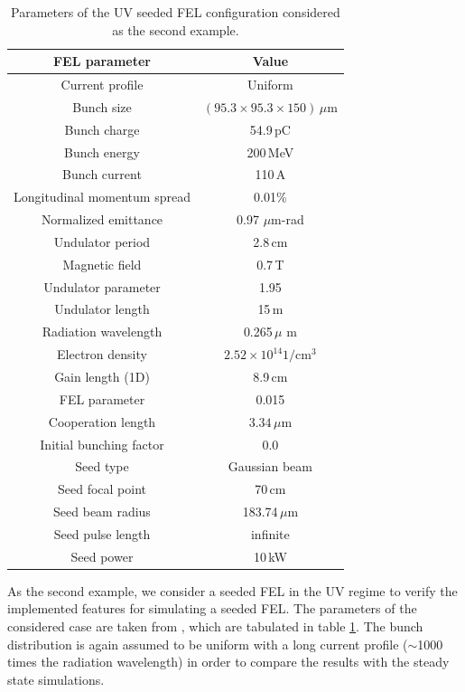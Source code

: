 \begin{table}
\label{example2}
\caption{Parameters of the UV seeded FEL configuration considered as the second example.}
\centering
\begin{tabular}{|c||c|}
\hline
FEL parameter & Value \\ \hline \hline
Current profile & Uniform \\ \hline
Bunch size & $(95.3\times95.3\times150)\,\mu$m \\ \hline
Bunch charge & 54.9\,pC \\ \hline
Bunch energy & 200\,MeV \\	\hline
Bunch current & 110\,A \\ \hline
Longitudinal momentum spread & 0.01\% \\ \hline
Normalized emittance & 0.97 $\mu$m-rad \\	\hline
Undulator period & 2.8\,cm \\ \hline
Magnetic field & 0.7\,T \\ \hline
Undulator parameter & 1.95 \\ \hline
Undulator length & 15\,m \\ \hline
Radiation wavelength & 0.265\,$\mu$ m \\ \hline
Electron density & $2.52\times10^{14} 1/\text{cm}^3$ \\ \hline
Gain length (1D) & 8.9\,cm \\ \hline
FEL parameter & 0.015 \\ \hline
Cooperation length & $3.34\,\mu$m \\ \hline
Initial bunching factor & $0.0$ \\ \hline
Seed type & Gaussian beam \\ \hline
Seed focal point & 70\,cm \\ \hline
Seed beam radius & 183.74\,$\mu$m \\ \hline
Seed pulse length & infinite \\ \hline
Seed power & 10\,kW \\ \hline
\end{tabular}
\end{table}
%
As the second example, we consider a seeded FEL in the UV regime to verify the implemented features for simulating a seeded FEL.
%
The parameters of the considered case are taken from \cite{andriyash2015spectral}, which are tabulated in table \ref{example2}.
%
The bunch distribution is again assumed to be uniform with a long current profile ($\sim$1000 times the radiation wavelength) in order to compare the results with the steady state simulations.
